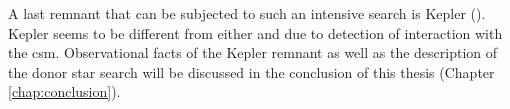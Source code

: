 A last remnant that can be subjected to such an intensive search is Kepler (). Kepler seems to be different from either  and  due to detection of interaction with the \gls{csm}. Observational facts of the Kepler remnant  as well as the description of the donor star search will be discussed in the conclusion of this thesis (Chapter \ref{chap:conclusion}).


